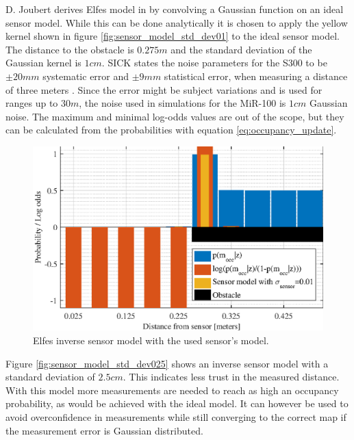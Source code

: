 D. Joubert derives Elfes model in \cite{Joubert2014} by convolving a Gaussian function on an ideal sensor model. While this can be done analytically it is chosen to apply the yellow kernel shown in figure \vref{fig:sensor_model_std_dev01} to the ideal sensor model.
The distance to the obstacle is $0.275m$ and the standard deviation of the Gaussian kernel is $1cm$. 
SICK states the noise parameters for the S300 to be $\pm20mm$ systematic error and $\pm9mm$ statistical error, when measuring a distance of three meters \cite{lidarDatasheet}. 
Since the error might be subject variations and is used for ranges up to $30m$, the noise used in simulations for the MiR-100 is $1cm$ Gaussian noise. 
The maximum and minimal log-odds values are out of the scope, but they can be calculated from the probabilities with equation \vref{eq:occupancy_update}.


\begin{figure}[htbp]
	\centering
	\includegraphics[scale=1.0]{figures/static_mapping/sensor_model_std_dev01}
	\caption{Elfes inverse sensor model with the used sensor's model.}
	\label{fig:sensor_model_std_dev01}
\end{figure}

Figure \vref{fig:sensor_model_std_dev025} shows an inverse sensor model with a standard deviation of $2.5cm$.
This indicates less trust in the measured distance. With this model more measurements are needed to reach as high an occupancy probability, as would be achieved with the ideal model. It can however be used to avoid overconfidence in measurements while still converging to the correct map if the measurement error is Gaussian distributed.

